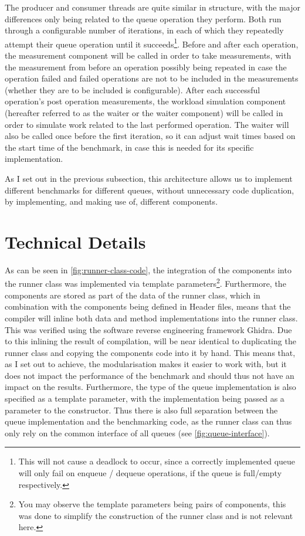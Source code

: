 The producer and consumer threads are quite similar in structure, with the major differences only being
related to the queue operation they perform.
Both run through a configurable number of iterations, in each of which they repeatedly attempt their queue operation
until it succeeds\footnote{This will not cause a deadlock to occur, since a correctly implemented queue will
only fail on enqueue / dequeue operations, if the queue is full/empty respectively.}.
Before and after each operation, the measurement component will be called in order to take measurements, with
the measurement from before an operation possibly being repeated in case the operation failed and failed
operations are not to be included in the measurements (whether they are to be included is configurable).
After each successful operation's post operation measurements, the workload simulation component (hereafter
referred to as the waiter or the waiter component) will be called in order to simulate work related
to the last performed operation.
The waiter will also be called once before the first iteration, so it can adjust wait times based on the
start time of the benchmark, in case this is needed for its specific implementation.

As I set out in the previous subsection, this architecture allows us to implement different benchmarks for
different queues, without unnecessary code duplication, by implementing, and making use of, different components.

\section{Technical Details}
\label{sec:framework-technical-details}



As can be seen in \autoref{fig:runner-class-code}, the integration of the components into the runner class
was implemented via template parameters\footnote{You may observe the template parameters being pairs of
components, this was done to simplify the construction of the runner class and is not relevant here.}.
Furthermore, the components are stored as part of the data of the runner class, which in combination with the
components being defined in Header files, means that the compiler will inline both data and method
implementations into the runner class.
This was verified using the software reverse engineering framework Ghidra.
Due to this inlining the result of compilation, will be near identical to duplicating the runner class and
copying the components code into it by hand.
This means that, as I set out to achieve, the modularisation makes it easier to work with, but it does not
impact the performance of the benchmark and should thus not have an impact on the results.
Furthermore, the type of the queue implementation is also specified as a template parameter, with the
implementation being passed as a parameter to the constructor.
Thus there is also full separation between the queue implementation and the benchmarking code, as the runner
class can thus only rely on the common interface of all queues (see \autoref{fig:queue-interface}).

